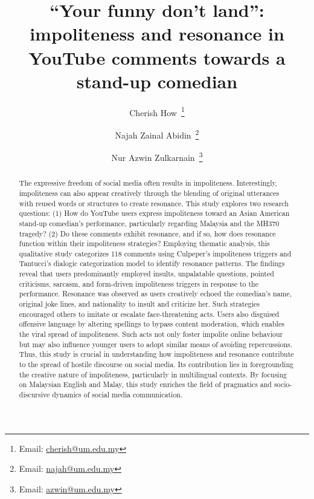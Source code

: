 \documentclass[english]{textolivre}
\title{``Your funny don’t land'': impoliteness and resonance in YouTube comments towards a stand-up comedian}
\author[1]{Cherish How~\orcid{0000-0002-9783-9173}\thanks{Email: \href{mailto:cherish@um.edu.my}{cherish@um.edu.my}}}
\author[1]{Najah Zainal Abidin~\orcid{0000-0001-8738-573X}\thanks{Email: \href{mailto:najah@um.edu.my}{najah@um.edu.my}}}
\author[1]{Nur Azwin Zulkarnain~\orcid{0009-0009-8976-4747}\thanks{Email: \href{mailto:azwin@um.edu.my}{azwin@um.edu.my}}}
\affil[1]{Universiti Malaya, Faculty of Languages and Linguistics, Department of English Language, Kuala Lumpur, Malaysia.}
\begin{document}
\maketitle

\begin{polyabstract}
\begin{abstract}
The expressive freedom of social media often results in impoliteness. Interestingly, impoliteness can also appear creatively through the blending of original utterances with reused words or structures to create resonance. This study explores two research questions: (1) How do YouTube users express impoliteness toward an Asian American stand-up comedian’s performance, particularly regarding Malaysia and the MH370 tragedy? (2) Do these comments exhibit resonance, and if so, how does resonance function within their impoliteness strategies? Employing thematic analysis, this qualitative study categorizes 118 comments using Culpeper’s impoliteness triggers and Tantucci’s dialogic categorization model to identify resonance patterns. The findings reveal that users predominantly employed insults, unpalatable questions, pointed criticisms, sarcasm, and form-driven impoliteness triggers in response to the performance. Resonance was observed as users creatively echoed the comedian’s name, original joke lines, and nationality to insult and criticize her. Such strategies encouraged others to imitate or escalate face-threatening acts. Users also disguised offensive language by altering spellings to bypass content moderation, which enables the viral spread of impoliteness. Such acts not only foster impolite online behaviour but may also influence younger users to adopt similar means of avoiding repercussions. Thus, this study is crucial in understanding how impoliteness and resonance contribute to the spread of hostile discourse on social media. Its contribution lies in foregrounding the creative nature of impoliteness, particularly in multilingual contexts. By focusing on Malaysian English and Malay, this study enriches the field of pragmatics and socio-discursive dynamics of social media communication. 
\end{abstract}


\end{polyabstract}
\end{document}
